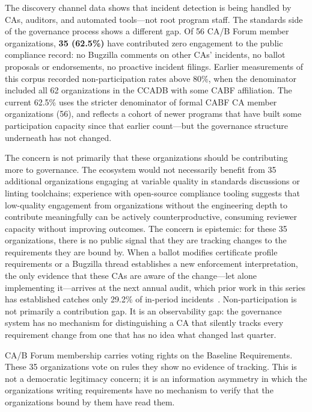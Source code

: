 \documentclass[10pt,twocolumn,letterpaper]{article}
\begin{document}
The discovery channel data shows that incident detection is being handled
by CAs, auditors, and automated tools---not root program staff. The
standards side of the governance process shows a different gap. Of 56 CA/B
Forum member organizations, \textbf{35 (62.5\%)} have contributed zero
engagement to the public compliance record: no Bugzilla comments on other
CAs' incidents, no ballot proposals or endorsements, no proactive incident
filings. Earlier measurements of this corpus recorded non-participation rates
above 80\%, when the denominator included all 62 organizations in the
CCADB with some CABF affiliation. The current 62.5\% uses the stricter
denominator of formal CABF CA member organizations (56), and reflects
a cohort of newer programs that have built some participation capacity
since that earlier count---but the governance structure underneath
has not changed.

The concern is not primarily that these organizations should be contributing
more to governance. The ecosystem would not necessarily benefit from 35
additional organizations engaging at variable quality in standards
discussions or linting toolchains; experience with open-source compliance
tooling suggests that low-quality engagement from organizations without
the engineering depth to contribute meaningfully can be actively
counterproductive, consuming reviewer capacity without improving outcomes.
The concern is epistemic: for these 35
organizations, there is no public signal that they are tracking changes to
the requirements they are bound by. When a ballot modifies certificate
profile requirements or a Bugzilla thread establishes a new enforcement
interpretation, the only evidence that these CAs are aware of the
change---let alone implementing it---arrives at the next annual audit,
which prior work in this series has established catches only 29.2\% of
in-period incidents~\cite{p2}. Non-participation is not primarily a
contribution gap. It is an observability gap: the governance system has no
mechanism for distinguishing a CA that silently tracks every requirement
change from one that has no idea what changed last quarter.

CA/B Forum membership carries voting rights on the Baseline Requirements.
These 35 organizations vote on rules they show no evidence of tracking.
This is not a democratic legitimacy concern; it is an information asymmetry
in which the organizations writing requirements have no mechanism to verify
that the organizations bound by them have read them.
\end{document}

